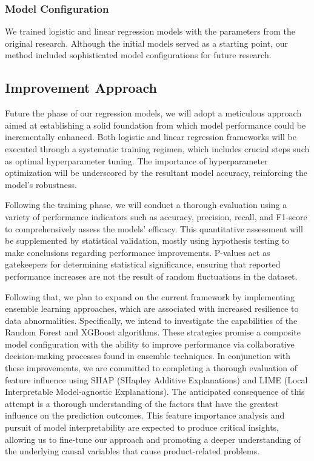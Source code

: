 \documentclass[conference]{IEEEtran}
\begin{document}
\subsubsection{Model Configuration}
We trained logistic and linear regression models with the parameters from the original research. Although the initial models served as a starting point, our method included sophisticated model configurations for future research.

\subsection{Improvement Approach}

Future the phase of our regression models, we will adopt a meticulous approach aimed at establishing a solid foundation from which model performance could be incrementally enhanced. Both logistic and linear regression frameworks will be executed through a systematic training regimen, which includes crucial steps such as optimal hyperparameter tuning. The importance of hyperparameter optimization will be underscored by the resultant model accuracy, reinforcing the model's robustness.

Following the training phase, we will conduct a thorough evaluation using a variety of performance indicators such as accuracy, precision, recall, and F1-score to comprehensively assess the models' efficacy. This quantitative assessment will be supplemented by statistical validation, mostly using hypothesis testing to make conclusions regarding performance improvements. P-values act as gatekeepers for determining statistical significance, ensuring that reported performance increases are not the result of random fluctuations in the dataset.

Following that, we plan to expand on the current framework by implementing ensemble learning approaches, which are associated with increased resilience to data abnormalities. Specifically, we intend to investigate the capabilities of the Random Forest and XGBoost algorithms. These strategies promise a composite model configuration with the ability to improve performance via collaborative decision-making processes found in ensemble techniques. In conjunction with these improvements, we are committed to completing a thorough evaluation of feature influence using SHAP (SHapley Additive Explanations) and LIME (Local Interpretable Model-agnostic Explanations). The anticipated consequence of this attempt is a thorough understanding of the factors that have the greatest influence on the prediction outcomes. This feature importance analysis and pursuit of model interpretability are expected to produce critical insights, allowing us to fine-tune our approach and promoting a deeper understanding of the underlying causal variables that cause product-related problems.
\end{document}
